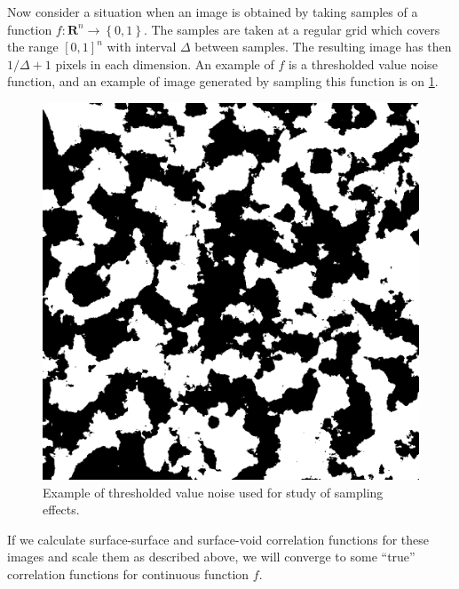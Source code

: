 \documentclass[reprint,amsmath,amssymb,aps,pre]{revtex4-1}
\begin{document}
Now consider a situation when an image is obtained by taking samples of a function
$f: \mathbf{R}^n \rightarrow \left\{0, 1\right\}$. The samples are taken at a regular grid
which covers the range $[0, 1]^n$  with interval $\Delta$ between samples. The
resulting image has then $1/\Delta + 1$ pixels in each dimension. An example of
$f$ is a thresholded value noise function, and an example of image generated by
sampling this function is on \cref{fig:noise}.

\begin{figure}[ht]
  \centering
  \includegraphics[width=0.9\linewidth]{images/noise.png}
  \caption[]{Example of thresholded value noise used for study of sampling
    effects.}
  \label{fig:noise}
\end{figure}

If we calculate surface-surface and surface-void correlation functions for these
images and scale them as described above, we will converge to some ``true''
correlation functions for continuous function $f$.
\end{document}
